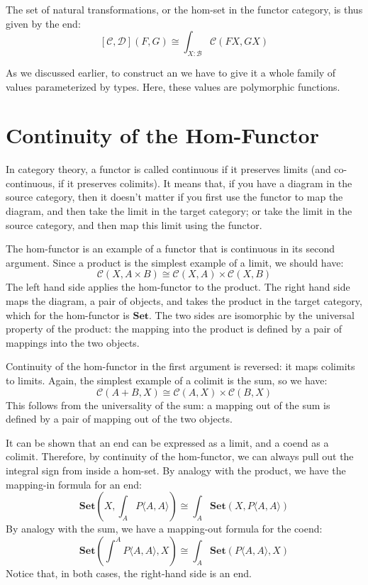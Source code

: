 \documentclass[DaoFP]{subfiles}
\begin{document}
The set of natural transformations, or the hom-set in the functor category, is thus given by the end:
\[ [\mathcal{C}, \mathcal{D}] (F, G) \cong \int_{X \colon  \mathcal{B}} \mathcal{C}(FX, GX)\]

As we discussed earlier, to construct an  we have to give it a whole family of values parameterized by types. Here, these values are polymorphic functions. 

\section{Continuity of the Hom-Functor}

In category theory, a functor is called continuous if it preserves limits (and co-continuous, if it preserves colimits). It means that, if you have a diagram in the source category, then it doesn't matter if you first use the functor to map the diagram, and then take the limit in the target category; or take the limit in the source category, and then map this limit using the functor. 

The hom-functor is an example of a functor that is continuous in its second argument. Since a product is the simplest example of a limit, we should have:
\[ \mathcal{C}(X, A \times B) \cong \mathcal{C}(X, A) \times \mathcal{C}(X, B) \]
The left hand side applies the hom-functor to the product. The right hand side maps the diagram, a pair of objects, and takes the product in the target category, which for the hom-functor is $\mathbf{Set}$. The two sides are isomorphic by the universal property of the product: the mapping into the product is defined by a pair of mappings into the two objects. 

Continuity of the hom-functor in the first argument is reversed: it maps colimits to limits. Again, the simplest example of a colimit is the sum, so we have:
\[ \mathcal{C}(A + B, X) \cong \mathcal{C}(A, X) \times \mathcal{C}(B, X) \]
This follows from the universality of the sum: a mapping out of the sum is defined by a pair of mapping out of the two objects.

It can be shown that an end can be expressed as a limit, and a coend as a colimit. Therefore, by continuity of the hom-functor, we can always pull out the integral sign from inside a hom-set. By analogy with the product, we have the mapping-in formula for an end:
\[ \mathbf{Set}\left(X, \int_A P\langle A, A \rangle \right) \cong \int_A  \mathbf{Set}(X, P\langle A, A \rangle) \]
By analogy with the sum, we have a mapping-out formula for the coend:
\[ \mathbf{Set}\left( \int^A P\langle A, A \rangle , X\right) \cong \int_A  \mathbf{Set}(P\langle A, A \rangle, X) \]
Notice that, in both cases, the right-hand side is an end.
\end{document}
